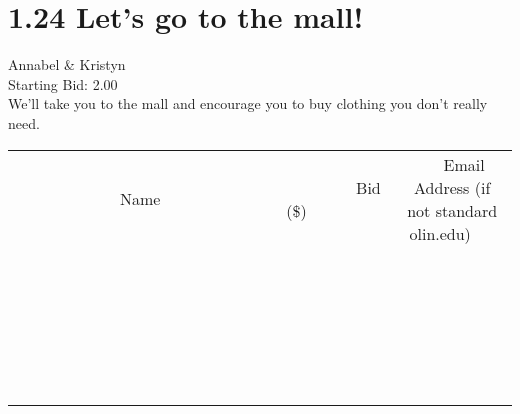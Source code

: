\documentclass[11pt]{article}
\begin{document}
					\section*{1.24 Let's go to the mall!}
					Annabel \& Kristyn \\
					Starting Bid: 2.00 \\
					We'll take you to the mall and encourage you to buy clothing you don't really need. \\
					[6ex]
					\begin{tabular}{c c c}
						~~~~~~~~~~~~~Name~~~~~~~~~~~~~ & ~~~~~~~~~Bid (\$)~~~~~~~~~ & ~~~Email Address (if not standard olin.edu)~~~ \\
				
 & & \\
\hline
 & & \\
\hline
 & & \\
\hline
 & & \\
\hline
 & & \\
\hline
 & & \\
\hline
 & & \\
\hline
 & & \\
\hline
 & & \\
\hline
 & & \\
\hline
 & & \\
\hline
 & & \\
\hline
 & & \\
\hline
 & & \\
\hline
 & & \\
\hline
 & & \\
\hline
 & & \\
\hline
 & & \\
\hline
 & & \\
\hline
 & & \\
\hline
 & & \\
\hline
 & & \\
\hline
 & & \\
\hline
 & & \\
\hline
 & & \\
\hline
 & & \\
\hline
					\end{tabular}
					\clearpage
				
\end{document}
